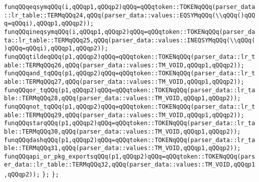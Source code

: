 \verb|funqQQqeqsymqQQq(i,qQQqp1,qQQqp2)qQQq=qQQqtoken::TOKENqQQq(parser_data::lr_table::TERMqQQq24,qQQq(parser_data::values::EQSYMqQQq(\\qQQq()qQQq=qQQqi),qQQqp1,qQQqp2));|\newline
\verb|funqQQqineqsymqQQq(i,qQQqp1,qQQqp2)qQQq=qQQqtoken::TOKENqQQq(parser_data::lr_table::TERMqQQq25,qQQq(parser_data::values::INEQSYMqQQq(\\qQQq()qQQq=qQQqi),qQQqp1,qQQqp2));|\newline
\verb|funqQQqtildeqQQq(p1,qQQqp2)qQQq=qQQqtoken::TOKENqQQq(parser_data::lr_table::TERMqQQq26,qQQq(parser_data::values::TM_VOID,qQQqp1,qQQqp2));|\newline
\verb|funqQQqand_tqQQq(p1,qQQqp2)qQQq=qQQqtoken::TOKENqQQq(parser_data::lr_table::TERMqQQq27,qQQq(parser_data::values::TM_VOID,qQQqp1,qQQqp2));|\newline
\verb|funqQQqor_tqQQq(p1,qQQqp2)qQQq=qQQqtoken::TOKENqQQq(parser_data::lr_table::TERMqQQq28,qQQq(parser_data::values::TM_VOID,qQQqp1,qQQqp2));|\newline
\verb|funqQQqnot_tqQQq(p1,qQQqp2)qQQq=qQQqtoken::TOKENqQQq(parser_data::lr_table::TERMqQQq29,qQQq(parser_data::values::TM_VOID,qQQqp1,qQQqp2));|\newline
\verb|funqQQqstarqQQq(p1,qQQqp2)qQQq=qQQqtoken::TOKENqQQq(parser_data::lr_table::TERMqQQq30,qQQq(parser_data::values::TM_VOID,qQQqp1,qQQqp2));|\newline
\verb|funqQQqdashqQQq(p1,qQQqp2)qQQq=qQQqtoken::TOKENqQQq(parser_data::lr_table::TERMqQQq31,qQQq(parser_data::values::TM_VOID,qQQqp1,qQQqp2));|\newline
\verb|funqQQqapi_or_pkg_exportsqQQq(p1,qQQqp2)qQQq=qQQqtoken::TOKENqQQq(parser_data::lr_table::TERMqQQq32,qQQq(parser_data::values::TM_VOID,qQQqp1,qQQqp2));|\newline
\verb|};|\newline
\verb|};|\newline

